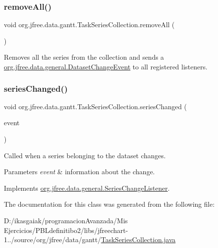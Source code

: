\subsubsection{\texorpdfstring{remove\+All()}{removeAll()}}
{\footnotesize\ttfamily void org.\+jfree.\+data.\+gantt.\+Task\+Series\+Collection.\+remove\+All (\begin{DoxyParamCaption}{ }\end{DoxyParamCaption})}

Removes all the series from the collection and sends a \mbox{\hyperlink{classorg_1_1jfree_1_1data_1_1general_1_1_dataset_change_event}{org.\+jfree.\+data.\+general.\+Dataset\+Change\+Event}} to all registered listeners. \mbox{\label{classorg_1_1jfree_1_1data_1_1gantt_1_1_task_series_collection_a57bb72acb135fb0dea4ff321dd58faa4}} 
\subsubsection{\texorpdfstring{series\+Changed()}{seriesChanged()}}
{\footnotesize\ttfamily void org.\+jfree.\+data.\+gantt.\+Task\+Series\+Collection.\+series\+Changed (\begin{DoxyParamCaption}\item[{\mbox{\hyperlink{classorg_1_1jfree_1_1data_1_1general_1_1_series_change_event}{Series\+Change\+Event}}}]{event }\end{DoxyParamCaption})}

Called when a series belonging to the dataset changes.


\begin{DoxyParams}{Parameters}
{\em event} & information about the change. \\
\hline
\end{DoxyParams}


Implements \mbox{\hyperlink{interfaceorg_1_1jfree_1_1data_1_1general_1_1_series_change_listener_a441fd65d1290b91e0184124be928ebf7}{org.\+jfree.\+data.\+general.\+Series\+Change\+Listener}}.



The documentation for this class was generated from the following file\+:\begin{DoxyCompactItemize}
\item 
D\+:/ikasgaiak/programacion\+Avanzada/\+Mis Ejercicios/\+P\+B\+Ldefinitibo2/libs/jfreechart-\/1../source/org/jfree/data/gantt/\mbox{\hyperlink{_task_series_collection_8java}{Task\+Series\+Collection.\+java}}\end{DoxyCompactItemize}
